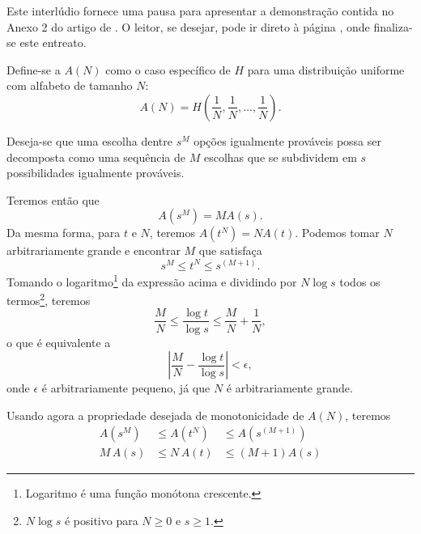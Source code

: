 \begin{interlude}
  \label{beginof:interlude:appendix2}
  Este interlúdio fornece uma pausa para apresentar a demonstração contida no
  Anexo 2 do artigo de \textcite{shannon1948}.  O leitor, se desejar, pode ir
  direto à página \pageref{endof:interlude:appendix2}, onde finaliza-se este
  entreato.

  Define-se a $A(N)$ como o caso específico de $H$ para uma distribuição
  uniforme com alfabeto de tamanho $N$:
  \begin{equation}
  A(N) = H\left( \frac{1}{N}, \frac{1}{N}, \ldots, \frac{1}{N} \right) .
  \end{equation}

  Deseja-se que uma escolha dentre $s^M$ opções igualmente prováveis possa ser
  decomposta como uma sequência de $M$ escolhas que se subdividem em $s$
  possibilidades igualmente prováveis.

  Teremos então que
  \begin{equation}
  A(s^M) = M A(s) .
  \end{equation}
  Da mesma forma, para $t$ e $N$, teremos $A(t^N) = N A(t)$.
  Podemos tomar $N$ arbitrariamente grande e encontrar $M$ que satisfaça
  \begin{equation}
  s^M \leq t^N \leq s^{(M+1)} .
  \end{equation}
  Tomando o logaritmo\footnote{Logaritmo é uma função monótona crescente.} da
  expressão acima e dividindo por $N \log s$ todos os termos\footnote{
      $N \log s$ é positivo para $N \geq 0$ e $s \geq 1$.
  }, teremos
  \begin{equation}
  \frac{M}{N} \leq \frac{\log t}{\log s} \leq \frac{M}{N} + \frac{1}{N} ,
  \end{equation}
  o que é equivalente a
  \begin{equation}
  \left\vert \frac{M}{N} - \frac{\log t}{\log s} \right\vert < \epsilon ,
  \end{equation}
  onde $\epsilon$ é arbitrariamente pequeno, já que $N$ é arbitrariamente
  grande.

  Usando agora a propriedade desejada de monotonicidade de $A(N)$, teremos
  \begin{subequations}
  \begin{alignat}{3}
  A(s^M) &\leq A(t^N) &\leq A(s^{(M+1)}) \\
  M \, A(s) &\leq N \, A(t) &\leq (M+1)A(s)
  \end{alignat}
  \end{subequations}


\end{interlude}
